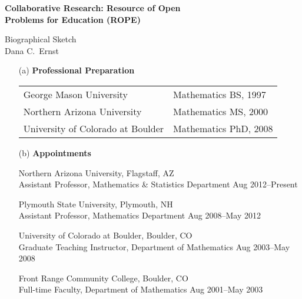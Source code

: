 \documentclass[11pt]{article}
\begin{document}
\begin{center}
{\Large \textbf{Collaborative Research: Resource of Open\\
Problems for Education (ROPE)}}

\bigskip

{\Large Biographical Sketch}\\
\vspace{.25em}
Dana C.~Ernst
\end{center}

\begin{enumerate}[leftmargin=*]

\item[(a)] \textbf{Professional Preparation}

\begin{tabularx}{6.4in}{@{}XX}
George Mason University  & Mathematics \hfill BS, 1997\\
Northern Arizona University & Mathematics \hfill MS, 2000\\
University of Colorado at Boulder & Mathematics \hfill PhD, 2008
\end{tabularx}

\item[(b)] \textbf{Appointments}

Northern Arizona University, Flagstaff, AZ\\
Assistant Professor, Mathematics \& Statistics Department  \hfill Aug 2012--Present

\vspace{.25em}

Plymouth State University, Plymouth, NH\\
Assistant Professor, Mathematics Department  \hfill Aug 2008--May 2012
 
\vspace{.25em}

University of Colorado at Boulder, Boulder, CO\\  
Graduate Teaching Instructor, Department of Mathematics  \hfill Aug 2003--May 2008


\vspace{.25em}

Front Range Community College, Boulder, CO\\
Full-time Faculty, Department of Mathematics \hfill Aug 2001--May 2003


\end{enumerate}
\end{document}
